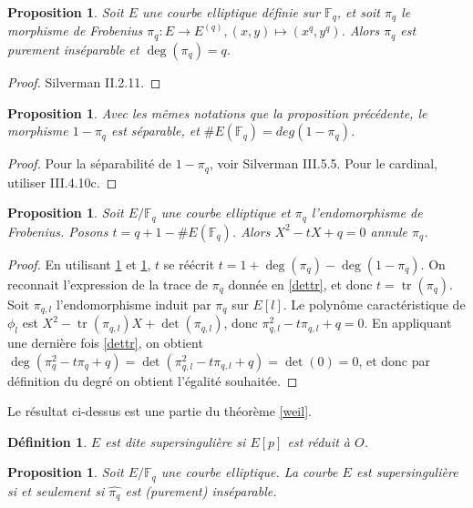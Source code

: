 \documentclass{article}
\theoremstyle{plain}%
\newtheorem{prop}[thm]{Proposition}
\newtheorem{deff}[thm]{Définition}
\theoremstyle{definition}%
\newcommand{\F}{\mathbb{F}}
\DeclareMathOperator{\tr}{tr}
\begin{document}
\begin{prop}
  \label{degpi}
  Soit $E$ une courbe elliptique définie sur $\F_q$, et soit $\pi_q$ le morphisme de Frobenius $\pi_q : E \to E^{(q)}, (x, y) \mapsto (x^q, y^q)$. Alors $\pi_q$ est purement inséparable et $\deg(\pi_q) =q$.
\end{prop}

\begin{proof}
  Silverman II.2.11.
\end{proof}

\begin{prop}
  \label{cardpi}
  Avec les mêmes notations que la proposition précédente, le morphisme $1-\pi_q$ est séparable, et $\#E(\F_q) = deg(1 - \pi_q)$.
\end{prop}

\begin{proof}
  Pour la séparabilité de $1-\pi_q$, voir Silverman III.5.5. Pour le cardinal, utiliser III.4.10c.
\end{proof}

\begin{prop}
  Soit $E/\F_q$ une courbe elliptique et $\pi_q$ l'endomorphisme de Frobenius. Posons $t=q+1-\#E(\F_q)$. Alors $X^2 -tX + q = 0$ annule $\pi_q$.
\end{prop}

\begin{proof}
  En utilisant \ref{degpi} et \ref{cardpi}, $t$ se réécrit $t = 1 + \deg(\pi_q) - \deg(1-\pi_q)$. On reconnait l'expression de la trace de $\pi_q$ donnée en \ref{dettr}, et donc $t = \tr(\pi_q)$. Soit $\pi_{q, l}$ l'endomorphisme induit par $\pi_q$ sur $E[l]$. Le polynôme caractéristique de $\phi_l$ est $X^2 -\tr(\pi_{q,l}) X + \det(\pi_{q, l})$, donc $\pi_{q,l}^2 - t\pi_{q,l}+q = 0$. En appliquant une dernière fois \ref{dettr}, on obtient $\deg(\pi_{q}^2 - t\pi_{q}+q ) = \det (\pi_{q,l}^2 - t\pi_{q,l}+q ) = \det(0) = 0$, et donc par définition du degré on obtient l'égalité souhaitée.
\end{proof}

Le résultat ci-dessus est une partie du théorème \ref{weil}.

\begin{deff}
  $E$ est dite supersingulière si $E[p]$ est réduit à $O$. 
\end{deff}

\begin{prop}
  \label{pihatsep}
  Soit $E/\F_q$ une courbe elliptique. La courbe $E$ est supersingulière si et seulement si $\widehat{\pi_q}$ est (purement) inséparable.
\end{prop}
\end{document}
